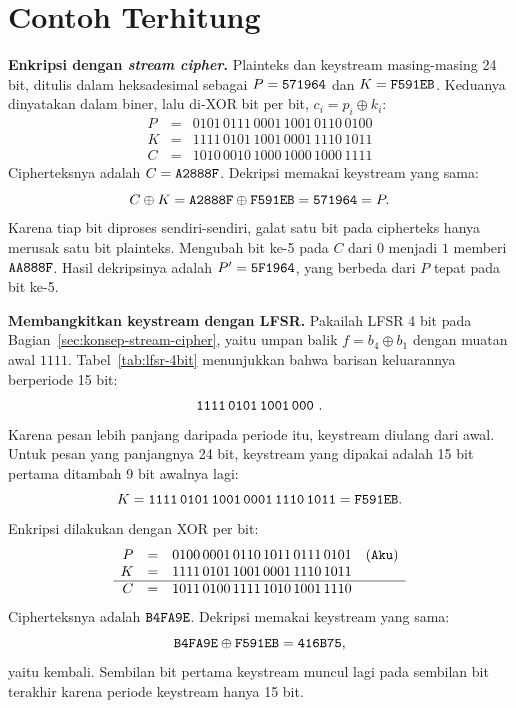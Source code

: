 \section{Contoh Terhitung}

\begin{example}
\textbf{Enkripsi dengan \textit{stream cipher}.} Plainteks dan keystream
masing-masing 24 bit, ditulis dalam heksadesimal sebagai $P=\texttt{571964}$ dan
$K=\texttt{F591EB}$. Keduanya dinyatakan dalam biner, lalu di-XOR bit per bit,
$c_i=p_i\oplus k_i$:
\[
\begin{array}{rcl}
P &=& 0101\,0111\,0001\,1001\,0110\,0100\\
K &=& 1111\,0101\,1001\,0001\,1110\,1011\\
\hline
C &=& 1010\,0010\,1000\,1000\,1000\,1111
\end{array}
\]
Cipherteksnya adalah $C=\texttt{A2888F}$. Dekripsi memakai keystream yang sama:
\[
C\oplus K=\texttt{A2888F}\oplus\texttt{F591EB}=\texttt{571964}=P.
\]
Karena tiap bit diproses sendiri-sendiri, galat satu bit pada cipherteks hanya
merusak satu bit plainteks. Mengubah bit ke-5 pada $C$ dari $0$ menjadi $1$
memberi $\texttt{AA888F}$. Hasil dekripsinya adalah $P'=\texttt{5F1964}$, yang
berbeda dari $P$ tepat pada bit ke-5.
\end{example}

\begin{example}
\textbf{Membangkitkan keystream dengan LFSR.} Pakailah LFSR 4 bit pada
Bagian~\ref{sec:konsep-stream-cipher}, yaitu umpan balik $f=b_4\oplus b_1$
dengan muatan awal $1111$. Tabel~\ref{tab:lfsr-4bit} menunjukkan bahwa barisan
keluarannya berperiode 15 bit:
\[
\texttt{1111\,0101\,1001\,000}\ .
\]
Karena pesan lebih panjang daripada periode itu, keystream diulang dari awal.
Untuk pesan  yang panjangnya 24 bit, keystream yang dipakai adalah 15
bit pertama ditambah 9 bit awalnya lagi:
\[
K=\texttt{1111\,0101\,1001\,0001\,1110\,1011}=\texttt{F591EB}.
\]
Enkripsi dilakukan dengan XOR per bit:
\[
\begin{array}{rcl}
P &=& 0100\,0001\,0110\,1011\,0111\,0101 \quad(\texttt{Aku})\\
K &=& 1111\,0101\,1001\,0001\,1110\,1011\\
\hline
C &=& 1011\,0100\,1111\,1010\,1001\,1110
\end{array}
\]
Cipherteksnya adalah $\texttt{B4FA9E}$. Dekripsi memakai keystream yang sama:
\[
\texttt{B4FA9E}\oplus\texttt{F591EB}=\texttt{416B75},
\]
yaitu  kembali. Sembilan bit pertama keystream muncul lagi pada
sembilan bit terakhir karena periode keystream hanya 15 bit.
\end{example}

